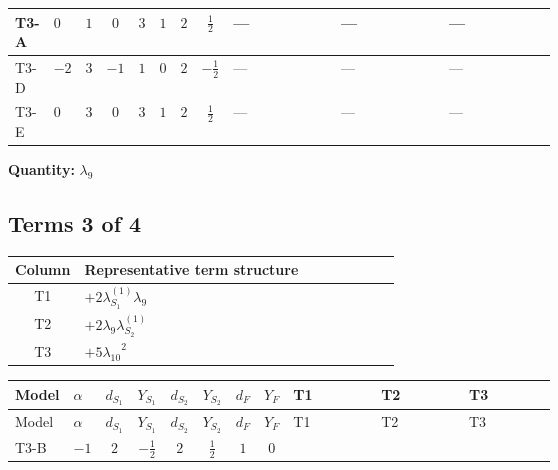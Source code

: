 \documentclass[8pt]{article}
\begin{document}
\begin{landscape}
\begin{longtable}{@{}llcccccc >{\raggedright\arraybackslash}p{0.21\linewidth} >{\raggedright\arraybackslash}p{0.21\linewidth} >{\raggedright\arraybackslash}p{0.21\linewidth}@{}}
\midrule
T3-A & $0$ & $1$ & $0$ & $3$ & $1$ & $2$ & $\frac{1}{2}$ & --- & --- & --- \\
\midrule
T3-D & $-2$ & $3$ & $-1$ & $1$ & $0$ & $2$ & $-\frac{1}{2}$ & --- & --- & --- \\
\midrule
T3-E & $0$ & $3$ & $0$ & $3$ & $1$ & $2$ & $\frac{1}{2}$ & --- & --- & --- \\
\midrule
\bottomrule
\end{longtable}
\clearpage
\noindent\textbf{Quantity: }$\lambda_{9}$\par\smallskip
\subsection*{Terms 3 of 4}
\begin{center}
\begin{tabular}{@{}c >{\raggedright\arraybackslash}p{0.82\linewidth}@{}}
\toprule
Column & Representative term structure \\
\midrule
T1 & \(\displaystyle +2 {\lambda_{S_1}^{(1)}} {\lambda_9}\) \\
\midrule
T2 & \(\displaystyle +2 {\lambda_9} {\lambda_{S_2}^{(1)}}\) \\
\midrule
T3 & \(\displaystyle +5 {\lambda_{10}}^2\) \\
\midrule
\bottomrule
\end{tabular}
\end{center}
\smallskip
\tiny
\begin{longtable}{@{}llcccccc >{\raggedright\arraybackslash}p{0.21\linewidth} >{\raggedright\arraybackslash}p{0.21\linewidth} >{\raggedright\arraybackslash}p{0.21\linewidth}@{}}
\toprule
Model & $\alpha$ & $d_{S_1}$ & $Y_{S_1}$ & $d_{S_2}$ & $Y_{S_2}$ & $d_F$ & $Y_F$ & T1 & T2 & T3 \\
\midrule
\endfirsthead
\toprule
Model & $\alpha$ & $d_{S_1}$ & $Y_{S_1}$ & $d_{S_2}$ & $Y_{S_2}$ & $d_F$ & $Y_F$ & T1 & T2 & T3 \\
\midrule
\endhead
T3-B & $-1$ & $2$ & $-\frac{1}{2}$ & $2$ & $\frac{1}{2}$ & $1$ & $0$ & \scriptsize\adjustbox{max width=\linewidth}{$\begin{gathered} +2 {\lambda_{S_1}^{(1)}} {\lambda_9}\end{gathered}$} & \scriptsize\adjustbox{max width=\linewidth}{$\begin{gathered} +2 {\lambda_9} {\lambda_{S_2}^{(1)}}\end{gathered}$} & \scriptsize\adjustbox{max width=\linewidth}{$\begin{gathered} +5 {\lambda_{10}}^2 \\ +5 {\lambda_{11}}^2\end{gathered}$} \\

\end{longtable}
\end{landscape}
\end{document}
